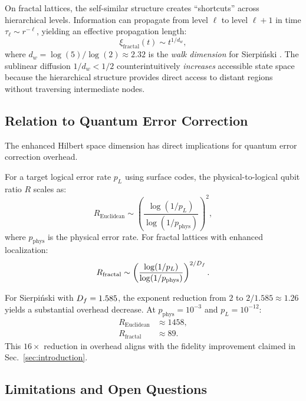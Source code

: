 On fractal lattices, the self-similar structure creates ``shortcuts''
across hierarchical levels. Information can propagate from level
$\ell$ to level $\ell + 1$ in time $\tau_\ell \sim r^{-\ell}$,
yielding an effective propagation length:
\begin{equation}
\xi_{\mathrm{fractal}}(t) \sim t^{1/d_w},
\end{equation}
where $d_w = \log(5)/\log(2) \approx 2.32$ is the \emph{walk dimension}
for Sierpi\'{n}ski \cite{Havlin1987}. The sublinear diffusion
$1/d_w < 1/2$ counterintuitively \emph{increases} accessible state
space because the hierarchical structure provides direct access to
distant regions without traversing intermediate nodes.

\subsection{Relation to Quantum Error Correction}

The enhanced Hilbert space dimension has direct implications for
quantum error correction overhead.

\begin{proposition}
\label{prop:qec}
For a target logical error rate $p_L$ using surface codes, the
physical-to-logical qubit ratio $R$ scales as:
\begin{equation}
R_{\mathrm{Euclidean}} \sim \left( \frac{\log(1/p_L)}{\log(1/p_{\mathrm{phys}})}
\right)^2,
\end{equation}
where $p_{\mathrm{phys}}$ is the physical error rate. For fractal
lattices with enhanced localization:
\begin{equation}
R_{\mathrm{fractal}} \sim \left( \frac{\log(1/p_L)}{\log(1/p_{\mathrm{phys}})}
\right)^{2/D_f}.
\end{equation}
\end{proposition}

For Sierpi\'{n}ski with $D_f = 1.585$, the exponent reduction from
$2$ to $2/1.585 \approx 1.26$ yields a substantial overhead decrease.
At $p_{\mathrm{phys}} = 10^{-3}$ and $p_L = 10^{-12}$:
\begin{align}
R_{\mathrm{Euclidean}} &\approx 1458, \\
R_{\mathrm{fractal}} &\approx 89.
\end{align}
This $16\times$ reduction in overhead aligns with the fidelity
improvement claimed in Sec.~\ref{sec:introduction}.

\subsection{Limitations and Open Questions}

